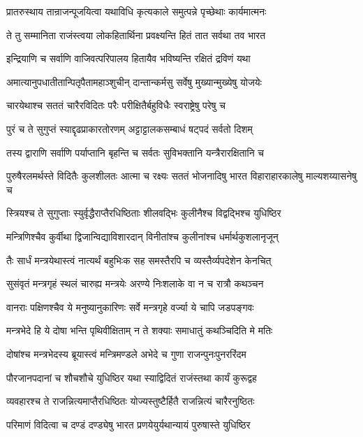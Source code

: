 \twolineshloka
{प्रातरुस्थाय तान्राजन्पूजयित्वा यथाविधि}
{कृत्यकाले समुत्पन्ने पृच्छेथाः कार्यमात्मनः}


\twolineshloka
{ते तु सम्मानिता राजंस्त्वया लोकहितार्थिना}
{प्रवक्ष्यन्ति हितं तात सर्वथा तव भारत}


\twolineshloka
{इन्द्रियाणि च सर्वाणि वाजिवत्परिपालय}
{हितायैव भविष्यन्ति रक्षितं द्रविणं यथा}


\twolineshloka
{अमात्यानुपधातीतान्पितृपैतामहाञ्शुचीन्}
{दान्तान्कर्मसु सर्वेषु मुख्यान्मुख्येषु योजयेः}


\twolineshloka
{चारयेथाश्च सततं चारैरविदितः परैः}
{परीक्षितैर्बहुविधैः स्वराष्ट्रेषु परेषु च}


\twolineshloka
{पुरं च ते सुगुप्तं स्याद्दृढप्राकारतोरणम्}
{अट्टाट्टालकसम्बाधं षट्पदं सर्वतो दिशम्}


\twolineshloka
{तस्य द्वाराणि सर्वाणि पर्याप्तानि बृहन्ति च}
{सर्वतः सुविभक्तानि यन्त्रैरारक्षितानि च}


\threelineshloka
{पुरुषैरलमर्थस्ते विदितैः कुलशीलतः}
{आत्मा च रक्ष्यः सततं भोजनादिषु भारत}
{विहाराहारकालेषु माल्यशय्यासनेषु च}


\twolineshloka
{स्त्रियश्च ते सुगुप्ताः स्युर्वृद्धैराप्तैरधिष्ठिताः}
{शीलवद्भिः कुलीनैश्च विद्वद्भिश्च युधिष्ठिर}


\twolineshloka
{मन्त्रिणिश्चैव कुर्वीथा द्विजान्विद्याविशारदान्}
{विनीतांश्च कुलीनांश्च धर्मार्थकुशलानृजून्}


\twolineshloka
{तैः सार्धं मन्त्रयेथास्त्वं नात्यर्थं बहुभिःक सह}
{समस्तैरपि च व्यस्तैर्व्यपदेशेन केनचित्}


\twolineshloka
{सुसंवृतं मन्त्रगृहं स्थलं चारुह्य मन्त्रयेः}
{अरण्ये निःशलाके वा न च रात्रौ कथञ्चन}


\twolineshloka
{वानराः पक्षिणश्चैव ये मनुष्यानुकारिणः}
{सर्वे मन्त्रगृहे वर्ज्या ये चापि जडपङ्गवः}


\twolineshloka
{मन्त्रभेदे हि ये दोषा भन्ति पृथिवीक्षिताम्}
{न ते शक्याः समाधातुं कथञ्चिदिति मे मतिः}


\twolineshloka
{दोषांश्च मन्त्रभेदस्य ब्रूयास्त्वं मन्त्रिमण्डले}
{अभेदे च गुणा राजन्पुनःपुनररिंदम}


\twolineshloka
{पौरजानपदानां च शौचशौचे युधिष्ठिर}
{यथा स्याद्विदितं राजंस्तथा कार्यं कुरूद्वह}


\twolineshloka
{व्यवहारश्च ते राजन्नित्यमाप्तैरधिष्ठितः}
{योज्यस्तुष्टैर्हितै राजन्नित्यं चारैरनुष्ठितः}


\twolineshloka
{परिमाणं विदित्वा च दण्डं दण्ड्येषु भारत}
{प्रणयेयुर्यथान्यायं पुरुषास्ते युधिष्ठिर}


